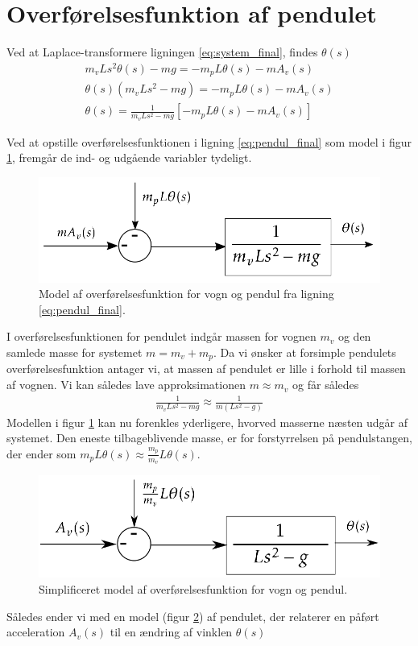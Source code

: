 \section{Overførelsesfunktion af pendulet}\label{sec:sec_penduloverforelse}
Ved at Laplace-transformere ligningen \ref{eq:system_final}, findes $\theta(s)$
\begin{align}
 m_vLs^2\theta(s) - mg = -m_pL\theta(s) -mA_v(s) \\
 \theta(s)\left(m_vLs^2 - mg \right) = -m_pL\theta(s) -mA_v(s) \\
 \theta(s) = \frac{1}{m_vLs^2 - mg }\left[-m_pL\theta(s) -mA_v(s)\right] \label{eq:pendul_final}
\end{align} 
 
Ved at opstille overførelsesfunktionen i ligning \ref{eq:pendul_final} som model i figur \ref{fig:pendul_trans1}, fremgår de ind- og udgående variabler tydeligt. 

\begin{figure}[h!]
	\centering
	\includegraphics[width=.6\textwidth]{billeder/pendul_trans1.png}
	\caption[Model af overførelsesfunktion for vogn og pendul.]{Model af overførelsesfunktion for vogn og pendul fra ligning \ref{eq:pendul_final}.}
	\label{fig:pendul_trans1}
\end{figure}
\FloatBlock

I overførelsesfunktionen for pendulet indgår massen for vognen $m_v$ og den samlede masse for systemet $m = m_v + m_p$.
Da vi ønsker at forsimple pendulets overførelsesfunktion antager vi, at massen af pendulet er lille i forhold til massen af vognen. 
Vi kan således lave approksimationen $m \approx m_v$ og får således
\begin{align}
\frac{1}{m_vLs^2 - mg } \approx  \frac{1}{m \left( Ls^2 - g \right) }
\end{align}     
Modellen i figur \ref{fig:pendul_trans1} kan nu forenkles yderligere, hvorved masserne næsten udgår af systemet.
Den eneste tilbageblivende masse, er for forstyrrelsen på pendulstangen, der ender som $m_pL\theta(s) \approx  \frac{m_p}{m_v}L\theta(s) $.

\begin{figure}[h!]
	\centering
	\includegraphics[width=.6\textwidth]{billeder/pendul_trans_clean.png}
	\caption{Simplificeret model af overførelsesfunktion for vogn og pendul.}
	\label{fig:pendul_trans_clean}
\end{figure}
\FloatBlock 
Således ender vi med en model (figur \ref{fig:pendul_trans_clean}) af pendulet, der relaterer en påført acceleration $A_v(s)$ til en ændring af vinklen $\theta(s)$

